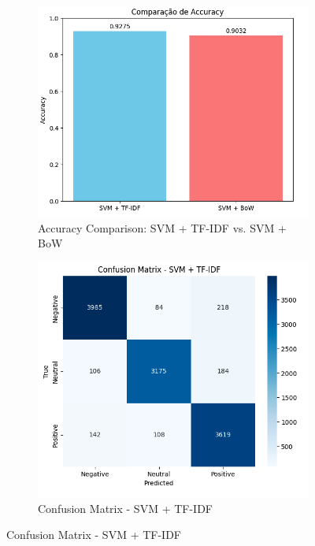 \begin{figure}[h!]
\centering
\begin{subfigure}[t]{0.30\textwidth}
\centering
\includegraphics[width=\textwidth]{./images/svm_accuracies.png}
\caption{Accuracy Comparison: SVM + TF-IDF vs. SVM + BoW}
\label{fig:svm_accuracies}
\end{subfigure}
\hfill
\begin{subfigure}[t]{0.30\textwidth}
\centering
\includegraphics[width=\textwidth]{./images/cm-svm-tfidf.png}
\caption{Confusion Matrix - SVM + TF-IDF}
\label{fig:cm_tfidf}

\end{subfigure}
\end{figure}
